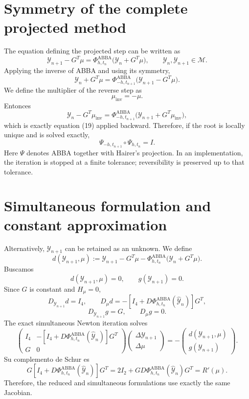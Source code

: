 \documentclass[11pt,a4paper]{article}
\newcommand{\Id}{I}
\newcommand{\Y}{\mathcal{Y}}
\newcommand{\M}{\mathcal{M}}
\newcommand{\PhiAB}{\Phi^{\mathrm{ABBA}}_{h,t_n}}
\begin{document}
\section{Symmetry of the complete projected method}

The equation defining the projected step can be written as
\[
 \boxed{
 \Y_{n+1}-G^T\mu
 =\Phi^{\mathrm{ABBA}}_{h,t_n}
  \bigl(\Y_n+G^T\mu\bigr),
 \qquad
 \Y_n,\Y_{n+1}\in\M.
 } \tag{19}
\]
Applying the inverse of ABBA and using its symmetry,
\[
 \Y_n+G^T\mu
 =\Phi^{\mathrm{ABBA}}_{-h,t_{n+1}}
  \bigl(\Y_{n+1}-G^T\mu\bigr).
\]
We define the multiplier of the reverse step as
\[
 \mu_{\mathrm{inv}}=-\mu.
\]
Entonces
\[
 \Y_n-G^T\mu_{\mathrm{inv}}
 =\Phi^{\mathrm{ABBA}}_{-h,t_{n+1}}
  \bigl(\Y_{n+1}+G^T\mu_{\mathrm{inv}}\bigr),
\]
which is exactly equation (19) applied backward. Therefore, if the root is locally unique
and is solved exactly,
\[
 \boxed{
 \Psi_{-h,t_{n+1}}\circ\Psi_{h,t_n}=\Id.
 } \tag{20}
\]
Here $\Psi$ denotes ABBA together with Hairer's projection. In an implementation, the
iteration is stopped at a finite tolerance; reversibility is preserved up to that tolerance.

\section{Simultaneous formulation and constant approximation}

Alternatively, $\Y_{n+1}$ can be retained as an unknown. We define
\[
 d(\Y_{n+1},\mu)
 :=\Y_{n+1}-G^T\mu
   -\PhiAB\bigl(\Y_n+G^T\mu\bigr).
\]
Buscamos
\[
 d(\Y_{n+1},\mu)=0,
 \qquad
 g(\Y_{n+1})=0.
\]
Since $G$ is constant and $H_\mu=0$,
\[
 D_{\Y_{n+1}}d=\Id_4,
 \qquad
 D_\mu d
 =-\left[\Id_4+D\PhiAB(\widehat{\Y}_n)\right]G^T,
\]
\[
 D_{\Y_{n+1}}g=G,
 \qquad
 D_\mu g=0.
\]
The exact simultaneous Newton iteration solves
\[
 \boxed{
 \begin{pmatrix}
  \Id_4&-\left[\Id_4+D\PhiAB(\widehat{\Y}_n)\right]G^T\\[2pt]
  G&0
 \end{pmatrix}
 \begin{pmatrix}
  \Delta\Y_{n+1}\\
  \Delta\mu
 \end{pmatrix}
 =-
 \begin{pmatrix}
  d(\Y_{n+1},\mu)\\
  g(\Y_{n+1})
 \end{pmatrix}.
 } \tag{21}
\]
Su complemento de Schur es
\[
 G\left[\Id_4+D\PhiAB(\widehat{\Y}_n)\right]G^T
 =2\Id_2+GD\PhiAB(\widehat{\Y}_n)G^T
 =R'(\mu).
\]
Therefore, the reduced and simultaneous formulations use exactly the same Jacobian.
\end{document}
